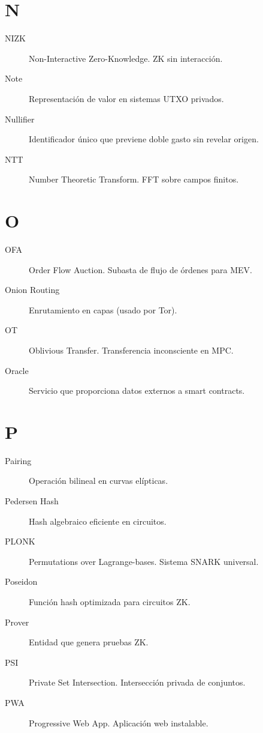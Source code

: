 \documentclass[11pt,a4paper,twoside]{book}
\theoremstyle{definition}
\theoremstyle{remark}
\begin{document}
\section*{N}
\begin{description}
\item[NIZK] Non-Interactive Zero-Knowledge. ZK sin interacción.
\item[Note] Representación de valor en sistemas UTXO privados.
\item[Nullifier] Identificador único que previene doble gasto sin revelar origen.
\item[NTT] Number Theoretic Transform. FFT sobre campos finitos.
\end{description}

\section*{O}
\begin{description}
\item[OFA] Order Flow Auction. Subasta de flujo de órdenes para MEV.
\item[Onion Routing] Enrutamiento en capas (usado por Tor).
\item[OT] Oblivious Transfer. Transferencia inconsciente en MPC.
\item[Oracle] Servicio que proporciona datos externos a smart contracts.
\end{description}

\section*{P}
\begin{description}
\item[Pairing] Operación bilineal en curvas elípticas.
\item[Pedersen Hash] Hash algebraico eficiente en circuitos.
\item[PLONK] Permutations over Lagrange-bases. Sistema SNARK universal.
\item[Poseidon] Función hash optimizada para circuitos ZK.
\item[Prover] Entidad que genera pruebas ZK.
\item[PSI] Private Set Intersection. Intersección privada de conjuntos.
\item[PWA] Progressive Web App. Aplicación web instalable.
\end{description}
\end{document}
